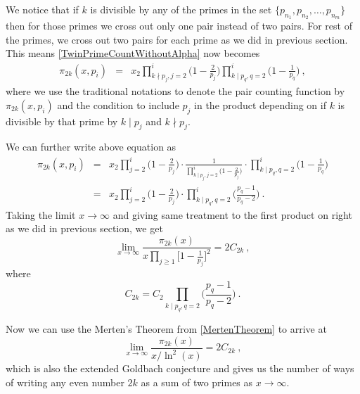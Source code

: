 \documentclass{article}
\numberwithin{equation}{section}
\begin{document}
We notice that if $k$ is divisible by any of the primes in the set $\{p_{n_1}, p_{n_2}, \ldots, p_{n_m} \}$ then for those primes we cross out only one pair instead of two pairs. For rest of the primes, we cross out two pairs for each prime as we did in previous section. This means \eqref{TwinPrimeCountWithoutAlpha} now becomes
\begin{eqnarray}
\pi_{2k}(x,p_i) & = & x_2 \prod\limits_{k\nmid p_j, j = 2}^i {\Big(1-\frac{2}{p_j}\Big)} \prod\limits_{k\mid p_q, q = 2}^i {\Big(1-\frac{1}{p_q}\Big)} ~ ,
\end{eqnarray}
where we use the traditional notations to denote the pair counting function by $\pi_{2k}(x,p_i)$ and the condition to include $p_j$ in the product depending on if $k$ is divisible by that prime by $k \mid p_j$ and $k \nmid p_j$.

We can further write above equation as
\begin{eqnarray} \nonumber
\pi_{2k}(x,p_i) & = & x_2 \prod\limits_{j = 2}^i {\Big(1-\frac{2}{p_j}\Big)} \cdot 
\frac{1}{\prod\limits_{k\mid p_j, j = 2}^i {\Big(1-\frac{2}{p_j}\Big)}}
\cdot \prod\limits_{k\mid p_q, q = 2}^i {\Big(1-\frac{1}{p_q}\Big)}
\nonumber\\
& = & x_2 \prod\limits_{j = 2}^i {\Big(1-\frac{2}{p_j}\Big)} \cdot \prod\limits_{k\mid p_q, q = 2}^i {\Big(\frac{p_q-1}{p_q-2}\Big)} ~ .
\end{eqnarray}
Taking the limit $x \to \infty$ and giving same treatment to the first product on right as we did in previous section, we get
\begin{equation} \nonumber
\lim_{x \to \infty} \frac{\pi_{2k}(x)}{x \prod\limits_{j \ge 1} {\Big[1-\frac{1}{{p_j }}\Big]^2}} = 2 C_{2k} ~ ,
\end{equation}
where
\begin{equation} \nonumber
C_{2k} = C_2 \prod\limits_{k\mid p_q, q = 2} {\Big(\frac{p_q-1}{p_q-2}\Big)} \nonumber ~ .
\end{equation}

Now we can use the Merten's Theorem from \eqref{MertenTheorem} to arrive at
\begin{equation} \label{ExtendedGoldbachConjecture}
\lim_{x \to \infty} \frac{\pi_{2k}(x)}{x / \ln^2(x)}= 2 C_{2k} ~ ,
\end{equation}
which is also the extended Goldbach conjecture and gives us the number of ways of writing any even number $2k$ as a sum of two primes as $x \to \infty$.



 
\end{document}
